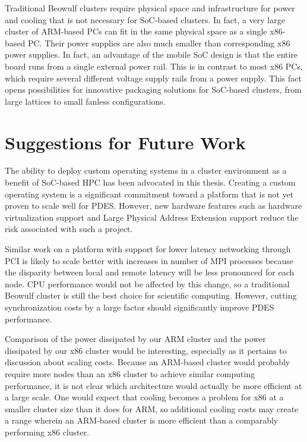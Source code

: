 \documentclass[11pt]{book}
\begin{document}
Traditional Beowulf clusters require physical space and infrastructure for power and
cooling that is not necessary for SoC-based clusters.  In fact, a very large cluster of
ARM-based PCs can fit in the same physical space as a single x86-based PC.  Their power
supplies are also much smaller than corresponding x86 power supplies.  In fact, an
advantage of the mobile SoC design is that the entire board runs from a single external
power rail.  This is in contrast to most x86 PCs, which require several different voltage
supply rails from a power supply.  This fact opens possibilities for innovative packaging
solutions for SoC-based clusters, from large lattices to small fanless configurations.

\section{Suggestions for Future Work}

The ability to deploy custom operating systems in a cluster environment as a benefit of
SoC-based HPC has been advocated in this thesis.  Creating a custom operating system is a
significant commitment toward a platform that is not yet proven to scale well for PDES.
However, new hardware features such as hardware virtualization support and Large Physical
Address Extension support reduce the risk associated with such a project.

Similar work on a platform with support for lower latency networking through PCI is likely
to scale better with increases in number of MPI processes because the disparity between
local and remote latency will be less pronounced for each node.  CPU performance would not
be affected by this change, so a traditional Beowulf cluster is still the best choice for
scientific computing.  However, cutting synchronization costs by a large factor should
significantly improve PDES performance.

Comparison of the power dissipated by our ARM cluster and the power dissipated by our x86
cluster would be interesting, especially as it pertains to discussion about scaling costs.
Because an ARM-based cluster would probably require more nodes than an x86 cluster to
achieve similar computing performance, it is not clear which architecture would actually
be more efficient at a large scale.  One would expect that cooling becomes a problem for
x86 at a smaller cluster size than it does for ARM, so additional cooling costs may create
a range wherein an ARM-based cluster is more efficient than a comparably performing x86
cluster.
\end{document}
